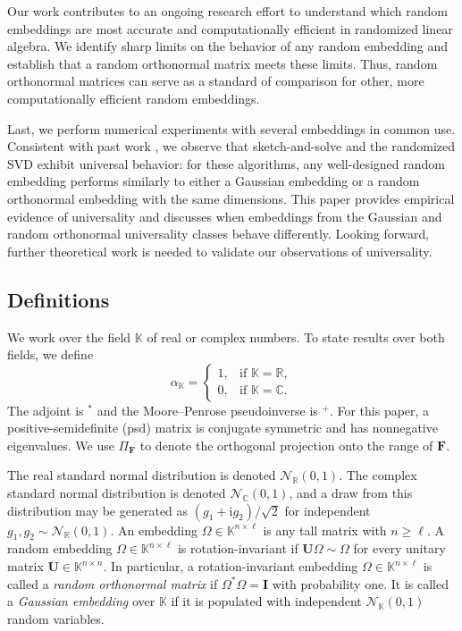 \documentclass[11pt]{article}
\newcommand{\real}{\mathbb{R}}
\newcommand{\complex}{\mathbb{C}}
\newcommand{\field}{\mathbb{K}}
\newcommand{\mat}[1]{\boldsymbol{#1}}
\newcommand{\Id}{\mathbf{I}}
\newcommand{\iu}{\mathrm{i}}
\theoremstyle{definition}
\numberwithin{equation}{section}
\begin{document}
Our work contributes to an ongoing research effort \cite{DL19a,TYUC19,MT20,Der23,DM23,MDM+23a,CEMT25,Epp25a} to understand which random embeddings are most accurate and computationally efficient
in randomized linear algebra.
We identify sharp limits on the behavior of any random embedding and establish that a random orthonormal matrix meets these limits.
Thus, random orthonormal matrices can serve as a standard of comparison for other, more computationally efficient random embeddings.

Last, we perform numerical experiments with several embeddings in common use.
Consistent with past work \cite{DL19a,TYUC19,MT20,Der23,CEMT25}, we observe that sketch-and-solve and the randomized SVD exhibit universal behavior: for these algorithms, any well-designed random embedding performs similarly to either a Gaussian embedding or a random orthonormal embedding with the same dimensions.
This paper provides empirical evidence of universality and discusses when embeddings from the Gaussian and random orthonormal universality classes behave differently.
Looking forward, further theoretical work is needed to validate our observations of universality.

\subsection{Definitions} \label{sec:definitions}
We work over the field $\field$ of real or complex numbers.
To state results over both fields, we define
%
\begin{equation*}
    \alpha_\field = \begin{cases}
            1, & \text{if } \field = \real, \\
            0, & \text{if } \field = \complex.
    \end{cases}
\end{equation*}
The adjoint is ${}^*$ and the Moore--Penrose pseudoinverse is ${}^+$.
For this paper, a positive-semidefinite (psd) matrix is conjugate symmetric and has nonnegative eigenvalues.
We use $\mat{\varPi}_{\mat{F}}$ to denote the orthogonal projection onto the range of $\mat{F}$.

The real standard normal distribution is denoted $\mathcal{N}_\real(0,1)$.
The complex standard normal distribution is denoted $\mathcal{N}_\complex(0,1)$, and a draw from this distribution may be generated as $(g_1 + \iu g_2) / \sqrt{2}$ for independent $g_1,g_2 \sim \mathcal{N}_\real(0,1)$.
An embedding $\mat{\varOmega} \in \field^{n \times \ell}$ is any tall matrix with $n \geq \ell$.
A random embedding $\mat{\varOmega} \in \field^{n \times \ell}$ is rotation-invariant if $\mat{U}\mat{\varOmega} \sim \mat{\varOmega}$ for every unitary matrix $\mat{U} \in \field^{n\times n}$.
In particular, a rotation-invariant embedding $\mat{\varOmega} \in \field^{n\times \ell}$ is called a \emph{random orthonormal matrix} if $\mat{\varOmega}^*\mat{\varOmega}= \Id$ with probability one.
It is called a \emph{Gaussian embedding} over $\field$ if it is populated with independent $\mathcal{N}_\field(0,1)$ random variables.
\end{document}
